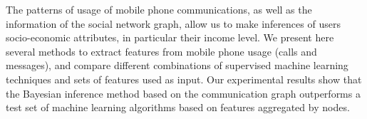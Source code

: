 The patterns of usage of mobile phone communications, as well as the information of the social network graph, allow us to make inferences of users socio-economic attributes, in particular their income level. 
We present here several methods to extract features from mobile phone usage (calls and messages), and compare different combinations of supervised machine learning techniques and sets of features used as input.  
Our experimental results show that the Bayesian inference method based on the communication graph outperforms a test set of machine learning algorithms based on features aggregated by nodes.
 

%
